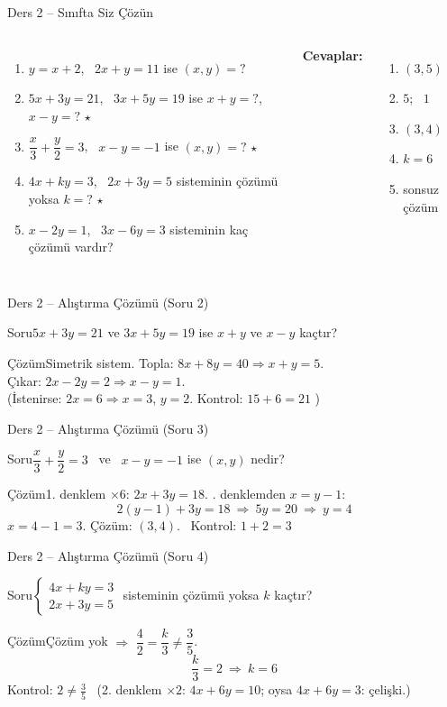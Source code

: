 \documentclass[aspectratio=169,11pt,handout]{beamer}
\newcommand{\soru}[3]{%
\begin{frame}{#1}
  \begin{block}{Soru}\large #2\end{block}
  \pause
  \begin{exampleblock}{Çözüm}\large #3\end{exampleblock}
\end{frame}}
\begin{document}
\begin{frame}{Ders 2 -- Sınıfta Siz Çözün}
\begin{columns}[t]
\begin{enumerate}
\item \(y=x+2\), \ \(2x+y=11\) ise \((x,y)=?\)
\item \(5x+3y=21\), \ \(3x+5y=19\) ise \(x+y=?\), \ \(x-y=?\) \(\star\)
\item \(\dfrac{x}{3}+\dfrac{y}{2}=3\), \ \(x-y=-1\) ise \((x,y)=?\) \(\star\)
\item \(4x+ky=3\), \ \(2x+3y=5\) sisteminin çözümü yoksa \(k=?\) \(\star\)
\item \(x-2y=1\), \ \(3x-6y=3\) sisteminin kaç çözümü vardır?
\end{enumerate}
\pause
\textbf{Cevaplar:}
\begin{enumerate}
\item \((3,5)\)
\item \(5\); \ \(1\)
\item \((3,4)\)
\item \(k=6\)
\item sonsuz çözüm
\end{enumerate}
\end{columns}
\vspace{4pt}{\footnotesize \(\star\) işaretli soruların adım adım çözümü sonraki slaytlardadır.}
\end{frame}

\soru{Ders 2 -- Alıştırma Çözümü (Soru 2)}
{\(5x+3y=21\) ve \(3x+5y=19\) ise \(x+y\) ve \(x-y\) kaçtır?}
{Simetrik sistem. Topla: \(8x+8y=40\Rightarrow x+y=5\).\\[3pt]
Çıkar: \(2x-2y=2\Rightarrow x-y=1\).\\[3pt]
(İstenirse: \(2x=6\Rightarrow x=3\), \(y=2\). Kontrol: \(15+6=21\) \checkmark)}

\soru{Ders 2 -- Alıştırma Çözümü (Soru 3)}
{\(\dfrac{x}{3}+\dfrac{y}{2}=3\) \ ve \ \(x-y=-1\) ise \((x,y)\) nedir?}
{1. denklem \(\times 6\): \(2x+3y=18\). \quad 2. denklemden \(x=y-1\):
\[2(y-1)+3y=18\ \Rightarrow\ 5y=20\ \Rightarrow\ y=4\]
\(x=4-1=3\). \quad Çözüm: \((3,4)\). \ Kontrol: \(1+2=3\) \checkmark}

\soru{Ders 2 -- Alıştırma Çözümü (Soru 4)}
{\(\begin{cases}4x+ky=3\\ 2x+3y=5\end{cases}\) \quad sisteminin çözümü yoksa \(k\) kaçtır?}
{Çözüm yok \(\Rightarrow\) \(\dfrac{4}{2}=\dfrac{k}{3}\neq\dfrac{3}{5}\).
\[\frac{k}{3}=2\ \Rightarrow\ k=6\]
Kontrol: \(2\neq\frac35\) \checkmark \ (2. denklem \(\times 2\): \(4x+6y=10\); oysa \(4x+6y=3\): çelişki.)}
\end{document}
